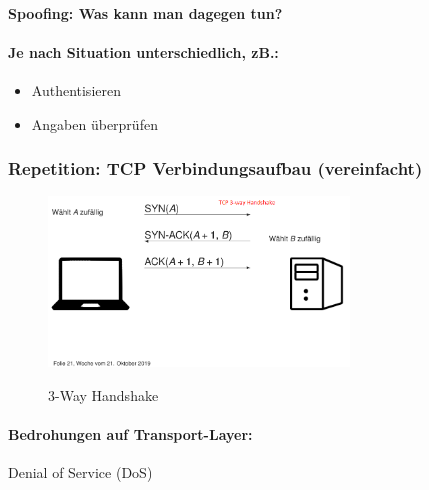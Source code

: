 \documentclass[10pt,a4paper]{article}
\begin{document}
\paragraph*{Spoofing: Was kann man dagegen tun?}
\paragraph*{Je nach Situation unterschiedlich, zB.:}
\begin{itemize}[noitemsep,topsep=0pt,leftmargin=*]
    \item {Authentisieren}
    \item {Angaben überprüfen}
\end{itemize}


\subsubsection*{Repetition: TCP Verbindungsaufbau (vereinfacht)}
\begin{figure}[H]
    \begin{center}
    \includegraphics[width=8cm]{images/Repetition_3_way_handshake.png}
    \caption{3-Way Handshake}
    \label{3-Way Handshake}
    \end{center}
\end{figure}

\pagebreak
\paragraph*{Bedrohungen auf Transport-Layer:} Denial of Service (DoS)
\end{document}
